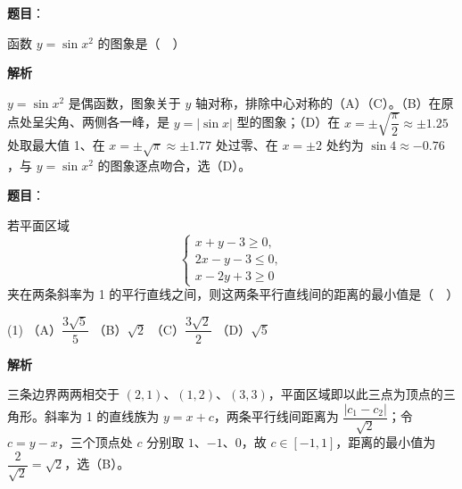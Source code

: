 \begin{answer}

\textbf{题目}：

函数 \(y=\sin x^{2}\) 的图象是（　）
\nopagebreak[4]
\begin{center}\end{center}
\nopagebreak[4]
\textbf{解析}

\(y=\sin x^{2}\) 是偶函数，图象关于 \(y\) 轴对称，排除中心对称的（A）（C）。（B）在原点处呈尖角、两侧各一峰，是 \(y=|\sin x|\) 型的图象；（D）在 \(x=\pm\sqrt{\dfrac{\pi}{2}}\approx\pm1.25\) 处取最大值 1、在 \(x=\pm\sqrt{\pi}\approx\pm1.77\) 处过零、在 \(x=\pm2\) 处约为 \(\sin 4\approx-0.76\)，与 \(y=\sin x^{2}\) 的图象逐点吻合，选（D）。


\end{answer}
\begin{answer}

\textbf{题目}：

若平面区域
\nopagebreak[4]
\[
\begin{cases}
x+y-3\geqslant 0,\\
2x-y-3\leqslant 0,\\
x-2y+3\geqslant 0
\end{cases}
\]
夹在两条斜率为 1 的平行直线之间，则这两条平行直线间的距离的最小值是（　）

\begin{gkopts}(1)
\task （A）\(\dfrac{3\sqrt{5}}{5}\)
\task （B）\(\sqrt{2}\)
\task （C）\(\dfrac{3\sqrt{2}}{2}\)
\task （D）\(\sqrt{5}\)
\end{gkopts}

\textbf{解析}

三条边界两两相交于 \((2,1)\)、\((1,2)\)、\((3,3)\)，平面区域即以此三点为顶点的三角形。斜率为 1 的直线族为 \(y=x+c\)，两条平行线间距离为 \(\dfrac{|c_{1}-c_{2}|}{\sqrt{2}}\)；令 \(c=y-x\)，三个顶点处 \(c\) 分别取 \(1\)、\(-1\)、\(0\)，故 \(c\in[-1,1]\)，距离的最小值为 \(\dfrac{2}{\sqrt{2}}=\sqrt{2}\)，选（B）。


\end{answer}
